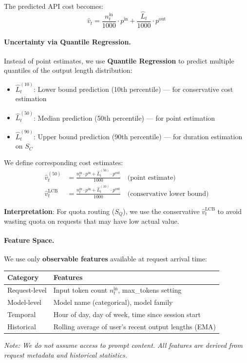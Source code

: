\documentclass[11pt]{article}
\begin{document}
The predicted API cost becomes:
\[ \hat{v}_t = \frac{n^{\text{in}}_t}{1000} \cdot p^{\text{in}} + \frac{\hat{L}_t}{1000} \cdot p^{\text{out}} \]

\paragraph{Uncertainty via Quantile Regression.}
Instead of point estimates, we use \textbf{Quantile Regression} to predict multiple quantiles of the output length distribution:
\begin{itemize}
  \item $\hat{L}^{(10)}_t$: Lower bound prediction (10th percentile) — for conservative cost estimation
  \item $\hat{L}^{(50)}_t$: Median prediction (50th percentile) — for point estimation
  \item $\hat{L}^{(90)}_t$: Upper bound prediction (90th percentile) — for duration estimation on $S_C$
\end{itemize}

We define corresponding cost estimates:
\begin{align}
  \hat{v}^{(50)}_t &= \frac{n^{\text{in}}_t \cdot p^{\text{in}} + \hat{L}^{(50)}_t \cdot p^{\text{out}}}{1000} \quad \text{(point estimate)} \\
  \hat{v}^{\text{LCB}}_t &= \frac{n^{\text{in}}_t \cdot p^{\text{in}} + \hat{L}^{(10)}_t \cdot p^{\text{out}}}{1000} \quad \text{(conservative lower bound)}
\end{align}

\textbf{Interpretation}: For quota routing ($S_Q$), we use the conservative $\hat{v}^{\text{LCB}}_t$ to avoid wasting quota on requests that may have low actual value.

\paragraph{Feature Space.}
We use only \textbf{observable features} available at request arrival time:
\begin{center}
\begin{tabular}{|l|l|}
\hline
\textbf{Category} & \textbf{Features} \\
\hline
Request-level & Input token count $n^{\text{in}}_t$, max\_tokens setting \\
Model-level & Model name (categorical), model family \\
Temporal & Hour of day, day of week, time since session start \\
Historical & Rolling average of user's recent output lengths (EMA) \\
\hline
\end{tabular}
\end{center}
\emph{Note: We do not assume access to prompt content. All features are derived from request metadata and historical statistics.}
\end{document}
